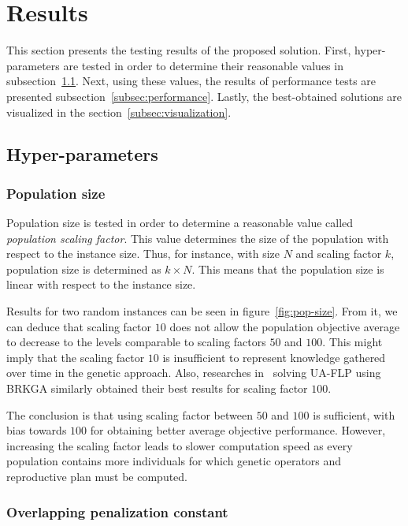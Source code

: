 \section{Results}\label{sec:results}

This section presents the testing results of the proposed solution.
First, hyper-parameters are tested in order to determine their reasonable values in subsection~\ref{subsec:hyper-parameters}.
Next, using these values, the results of performance tests are presented subsection~\ref{subsec:performance}.
Lastly, the best-obtained solutions are visualized in the section~\ref{subsec:visualization}.

\subsection{Hyper-parameters}\label{subsec:hyper-parameters}

\subsubsection*{Population size}

Population size is tested in order to determine a reasonable value called \textit{population scaling factor}.
This value determines the size of the population with respect to the instance size.
Thus, for instance, with size $N$ and scaling factor $k$, population size is determined as
$k \times N$.
This means that the population size is linear with respect to the instance size.

Results for two random instances can be seen in figure~\ref{fig:pop-size}.
From it, we can deduce that scaling factor $10$ does not allow
the population objective average to decrease to the levels comparable to scaling factors $50$ and $100$.
This might imply that the scaling factor $10$ is insufficient to represent knowledge gathered over time
in the genetic approach.
Also, researches in~\cite{goncalvesBiasedRandomkeyGenetic2015} solving UA-FLP using BRKGA
similarly obtained their best results for scaling factor $100$.

The conclusion is that using scaling factor between $50$ and $100$ is sufficient, with bias towards $100$
for obtaining better average objective performance.
However, increasing the scaling factor leads to slower computation speed as every population contains
more individuals for which genetic operators and reproductive plan must be computed.

\subsubsection*{Overlapping penalization constant}

